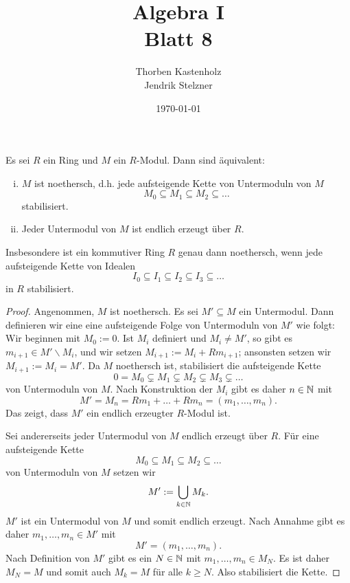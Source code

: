\documentclass[a4paper,10pt]{article}
\title{\sc Algebra I \\ \Large Blatt 8}
\author{Thorben Kastenholz \\ Jendrik Stelzner}
\date{\today}
\begin{document}
\maketitle

\section{}

\begin{lem}\label{lem: Äquivalente Definitionen von noethersch}
 Es sei $R$ ein Ring und $M$ ein $R$-Modul. Dann sind äquivalent:
 \begin{enumerate}[i)]
  \item $M$ ist noethersch, d.h. jede aufsteigende Kette von Untermoduln von $M$
  \[
   M_0 \subseteq M_1 \subseteq M_2 \subseteq \ldots
  \]
  stabilisiert.
  \item Jeder Untermodul von $M$ ist endlich erzeugt über $R$.
 \end{enumerate}
 Insbesondere ist ein kommutiver Ring $R$ genau dann noethersch, wenn jede aufsteigende Kette von Idealen
 \[
  I_0 \subseteq I_1 \subseteq I_2 \subseteq I_3 \subseteq \ldots
 \]
 in $R$ stabilisiert.
\end{lem}
\begin{proof}
 Angenommen, $M$ ist noethersch. Es sei $M' \subseteq M$ ein Untermodul. Dann definieren wir eine eine aufsteigende Folge von Untermoduln von $M'$ wie folgt: Wir beginnen mit $M_0 := 0$. Ist $M_i$ definiert und $M_i \neq M'$, so gibt es $m_{i+1} \in M' \smallsetminus M_i$, und wir setzen $M_{i+1} := M_i + R m_{i+1}$; ansonsten setzen wir $M_{i+1} := M_i = M'$. Da $M$ noethersch ist, stabilisiert die aufsteigende Kette
 \[
  0 = M_0 \subsetneq M_1 \subsetneq M_2 \subsetneq M_3 \subsetneq \ldots
 \]
 von Untermoduln von $M$. Nach Konstruktion der $M_i$ gibt es daher $n \in \mathbb{N}$ mit
 \[
  M' = M_n = Rm_1 + \ldots + Rm_n = (m_1, \ldots, m_n).
 \]
 Das zeigt, dass $M'$ ein endlich erzeugter $R$-Modul ist.
 
 Sei andererseits jeder Untermodul von $M$ endlich erzeugt über $R$. Für eine aufsteigende Kette
 \[
  M_0 \subseteq M_1 \subseteq M_2 \subseteq \ldots
 \]
 von Untermoduln von $M$ setzen wir
 \[
  M' := \bigcup_{k \in \mathbb{N}} M_k.
 \]
 $M'$ ist ein Untermodul von $M$ und somit endlich erzeugt. Nach Annahme gibt es daher $m_1, \ldots, m_n \in M'$ mit
 \[
  M' = (m_1, \ldots, m_n).
 \]
 Nach Definition von $M'$ gibt es ein $N \in \mathbb{N}$ mit $m_1, \ldots, m_n \in M_N$. Es ist daher $M_N = M$ und somit auch $M_k = M$ für alle $k \geq N$. Also stabilisiert die Kette.
\end{proof}
\end{document}

